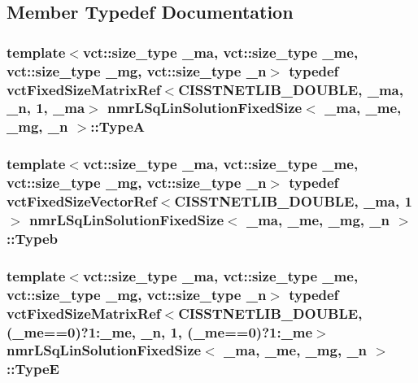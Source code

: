 \subsection{Member Typedef Documentation}
\hypertarget{classnmr_l_sq_lin_solution_fixed_size_a7a9b41c20d4c0b44cdae4bf7b39f7e39}{
\subsubsection[{Type\-A}]{\setlength{\rightskip}{0pt plus 5cm}template$<$vct\-::size\-\_\-type \-\_\-ma, vct\-::size\-\_\-type \-\_\-me, vct\-::size\-\_\-type \-\_\-mg, vct\-::size\-\_\-type \-\_\-n$>$ typedef {\bf vct\-Fixed\-Size\-Matrix\-Ref}$<$C\-I\-S\-S\-T\-N\-E\-T\-L\-I\-B\-\_\-\-D\-O\-U\-B\-L\-E, \-\_\-ma, \-\_\-n, 1, \-\_\-ma$>$ {\bf nmr\-L\-Sq\-Lin\-Solution\-Fixed\-Size}$<$ \-\_\-ma, \-\_\-me, \-\_\-mg, \-\_\-n $>$\-::{\bf Type\-A}}}\label{classnmr_l_sq_lin_solution_fixed_size_a7a9b41c20d4c0b44cdae4bf7b39f7e39}
\hypertarget{classnmr_l_sq_lin_solution_fixed_size_a9fca08d2c610b0087085dd343e5d171b}{
\subsubsection[{Typeb}]{\setlength{\rightskip}{0pt plus 5cm}template$<$vct\-::size\-\_\-type \-\_\-ma, vct\-::size\-\_\-type \-\_\-me, vct\-::size\-\_\-type \-\_\-mg, vct\-::size\-\_\-type \-\_\-n$>$ typedef {\bf vct\-Fixed\-Size\-Vector\-Ref}$<$C\-I\-S\-S\-T\-N\-E\-T\-L\-I\-B\-\_\-\-D\-O\-U\-B\-L\-E, \-\_\-ma, 1$>$ {\bf nmr\-L\-Sq\-Lin\-Solution\-Fixed\-Size}$<$ \-\_\-ma, \-\_\-me, \-\_\-mg, \-\_\-n $>$\-::{\bf Typeb}}}\label{classnmr_l_sq_lin_solution_fixed_size_a9fca08d2c610b0087085dd343e5d171b}
\hypertarget{classnmr_l_sq_lin_solution_fixed_size_a74ac0c633236e0b04e8969f7fbfc92a6}{
\subsubsection[{Type\-E}]{\setlength{\rightskip}{0pt plus 5cm}template$<$vct\-::size\-\_\-type \-\_\-ma, vct\-::size\-\_\-type \-\_\-me, vct\-::size\-\_\-type \-\_\-mg, vct\-::size\-\_\-type \-\_\-n$>$ typedef {\bf vct\-Fixed\-Size\-Matrix\-Ref}$<$C\-I\-S\-S\-T\-N\-E\-T\-L\-I\-B\-\_\-\-D\-O\-U\-B\-L\-E, (\-\_\-me==0)?1\-:\-\_\-me, \-\_\-n, 1, (\-\_\-me==0)?1\-:\-\_\-me$>$ {\bf nmr\-L\-Sq\-Lin\-Solution\-Fixed\-Size}$<$ \-\_\-ma, \-\_\-me, \-\_\-mg, \-\_\-n $>$\-::{\bf Type\-E}}}\label{classnmr_l_sq_lin_solution_fixed_size_a74ac0c633236e0b04e8969f7fbfc92a6}
